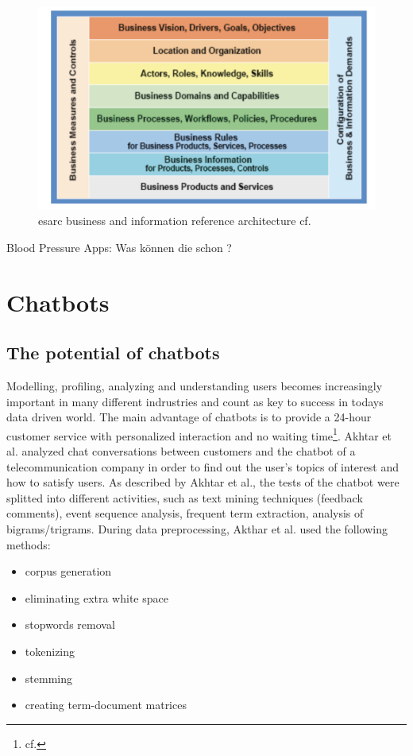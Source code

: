 \begin{figure}[htbp]
	\centering
	\includegraphics[width=1\textwidth]{images/esarc_business.png}
	\caption{\ac{esarc} business and information reference architecture cf.\autocite{zimmermann}}
	\label{vp_architecture}
\end{figure}

Blood Pressure Apps:
Was können die schon ? 
\section{Chatbots} 

\subsection{The potential of chatbots}
Modelling, profiling, analyzing and understanding users becomes increasingly important in many different indrustries and count as key to success in todays data driven world. 
The main advantage of chatbots is to provide a 24-hour customer service with personalized interaction and no waiting time\footnote{cf.\autocite{akhtar}}.
Akhtar et al. analyzed chat conversations between customers and the chatbot of a telecommunication company in order to find out the user's topics of interest and how to satisfy users. As described by Akhtar et al., the tests of the chatbot were splitted into different activities, such as text mining techniques (feedback comments), event sequence analysis, frequent term extraction, analysis of bigrams/trigrams. 
During data preprocessing, Akthar et al. used the following methods:
\begin{itemize}
\setlength\itemsep{-0.5em}
  \item[1.] corpus generation
  \item[2.] eliminating extra white space
  \item[3.] stopwords removal
  \item[4.] tokenizing
  \item[5.] stemming
  \item[6.] creating term-document matrices
\end{itemize}

